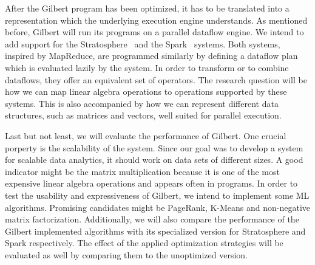 After the Gilbert program has been optimized, it has to be translated into a representation which the underlying execution engine understands.
As mentioned before, Gilbert will run its programs on a parallel dataflow engine.
We intend to add support for the Stratosphere~\cite{alexandrov:2011a} and the Spark~\cite{zaharia:2010a} systems.
Both systems, inspired by MapReduce, are programmed similarly by defining a dataflow plan which is evaluated lazily by the system.
In order to transform or to combine dataflows, they offer an equivalent set of operators.
The research question will be how we can map linear algebra operations to operations supported by these systems.
This is also accompanied by how we can represent different data structures, such as matrices and vectors, well suited for parallel execution.

Last but not least, we will evaluate the performance of Gilbert.
One crucial porperty is the scalability of the system.
Since our goal was to develop a system for scalable data analytics, it should work on data sets of different sizes.
A good indicator might be the matrix multiplication because it is one of the most expensive linear algebra operations and appears often in programs.
In order to test the usability and expressiveness of Gilbert, we intend to implement some ML algorithms.
Promising candidates might be PageRank, K-Means and non-negative matrix factorization.
Additionally, we will also compare the performance of the Gilbert implemented algorithms with its specialized version for Stratosphere and Spark respectively.
The effect of the applied optimization strategies will be evaluated as well by comparing them to the unoptimized version.